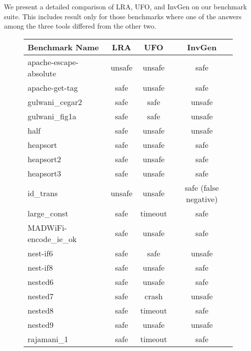 We present a detailed comparison of {\sc LRA}, {\sc UFO}, and {\sc InvGen} on
our benchmark suite.  This includes result only for those benchmarks where one
of the answers among the three tools differed from the other two.
\begin{figure}
\begin{tabular}{|l|c|c|c|} \hline

 Benchmark Name           &  {\sc LRA}    & {\sc UFO}     & {\sc InvGen}                \\ \hline \hline

 apache-escape-absolute   & unsafe  & unsafe  & safe                  \\
 apache-get-tag           & safe    & unsafe  & safe                  \\
 gulwani\_cegar2           & safe    & safe    & unsafe                \\
 gulwani\_fig1a            & safe    & safe    & unsafe                \\
 half                     & safe    & unsafe  & unsafe                \\
 heapsort                 & safe    & unsafe  & safe                  \\
 heapsort2                & safe    & unsafe  & safe                  \\
 heapsort3                & safe    & unsafe  & safe                  \\
 id\_trans                 & unsafe  & unsafe  & safe (false negative) \\
 large\_const              & safe    & timeout & safe                  \\
 MADWiFi-encode\_ie\_ok     & safe    & unsafe  & safe                  \\
 nest-if6                 & safe    & safe    & unsafe                \\
 nest-if8                 & safe    & unsafe  & safe                  \\
 nested6                  & safe    & unsafe  & safe                  \\
 nested7                  & safe    & crash   & unsafe                \\
 nested8                  & safe    & timeout & safe                  \\
 nested9                  & safe    & unsafe  & unsafe                \\
 rajamani\_1               & safe    & timeout & safe                  \\

\end{tabular}
\end{figure}
